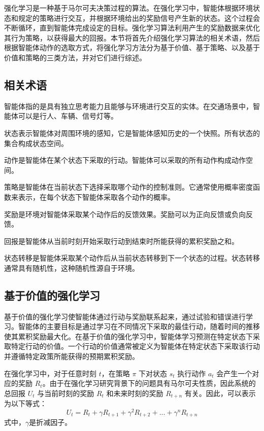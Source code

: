 强化学习是一种基于马尔可夫决策过程的算法。在强化学习中，智能体根据环境状态和规定的策略进行交互，并根据环境给出的奖励信号产生新的状态。这个过程会不断循环，直到智能体完成设定的目标\cite{JSYJ201008008}。强化学习算法利用产生的奖励数据来优化其行为策略，以获得最大的回报。本节将首先介绍强化学习算法的相关术语，然后根据智能体动作的选取方式，将强化学习方法分为基于价值、基于策略、以及基于价值和策略的三类方法，并对它们进行综述。
\subsection{相关术语}

智能体指的是具有独立思考能力且能够与环境进行交互的实体。在交通场景中，智能体可以是行人、车辆、信号灯等。

状态表示智能体对周围环境的感知，它是智能体感知历史的一个快照。所有状态的集合构成状态空间。

动作是智能体在某个状态下采取的行动。智能体可以采取的所有动作构成动作空间。

策略是智能体在当前状态下选择采取哪个动作的控制准则。它通常使用概率密度函数来表示，在每个状态下智能体采取各个动作的概率。

奖励是环境对智能体采取某个动作后的反馈效果。奖励可以为正向反馈或负向反馈。

回报是智能体从当前时刻开始采取行动到结束时所能获得的累积奖励之和。

状态转移是智能体采取某个动作后从当前状态转移到下一个状态的过程。状态转移通常具有随机性，这种随机性源自于环境\cite{MOTO200401010}。
\subsection{基于价值的强化学习}

基于价值的强化学习使智能体通过行动与奖励联系起来，通过试验和错误进行学习。智能体的主要目标是通过学习在不同情况下采取的最佳行动，随着时间的推移使其累积奖励最大化。在基于价值的强化学习中，智能体学习预测在特定状态下采取特定行动的价值。一个行动的价值通常被定义为智能体在特定状态下采取该行动并遵循特定政策所能获得的预期累积奖励。


在强化学习中，对于任意时刻 $t$，在策略 $\pi$ 下对状态 $s_t$ 执行动作 $a_t$ 会产生一个对应的奖励 $R_t$。由于在强化学习研究背景下的问题具有马尔可夫性质，因此系统的总回报 $U_t$ 与当前时刻的奖励 $R_t$ 和未来时刻的奖励 $R_{t+n}$ 有关。因此，可以表示为以下等式：
\begin{equation}
  \label{eq:2_1}
  U_t = R_t + \gamma R_{t+1} + \gamma^2 R_{t+2} + ... + \gamma^n R_{t+n}
\end{equation}
式中，$\gamma$是折减因子。

